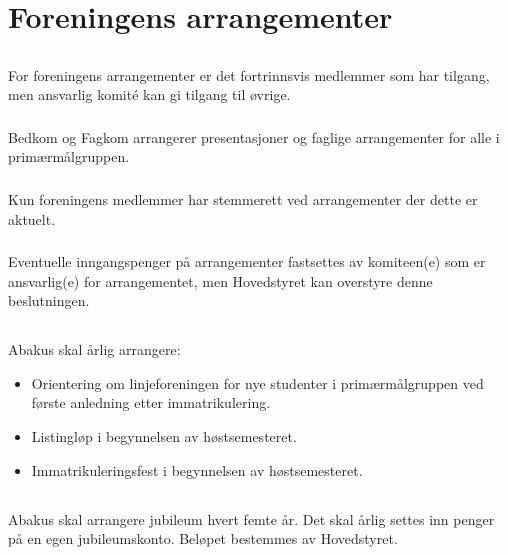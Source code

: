 \section{Foreningens arrangementer}

\subsection{}
\subsubsection{}
For foreningens arrangementer er det fortrinnsvis medlemmer som har tilgang, men ansvarlig komité kan gi tilgang til øvrige.

\subsubsection{}
Bedkom og Fagkom arrangerer presentasjoner og faglige arrangementer for alle i primærmålgruppen.

\subsubsection{}
Kun foreningens medlemmer har stemmerett ved arrangementer der dette er aktuelt.

\subsubsection{}
Eventuelle inngangspenger på arrangementer fastsettes av komiteen(e) som er
ansvarlig(e) for arrangementet, men Hovedstyret kan overstyre denne
beslutningen.

\subsection{}
Abakus skal årlig arrangere:

\begin{itemize}
  \item Orientering om linjeforeningen for nye studenter i primærmålgruppen ved første anledning etter immatrikulering.
  \item Listingløp i begynnelsen av høstsemesteret.
  \item Immatrikuleringsfest i begynnelsen av høstsemesteret.
\end{itemize}

\subsection{}
Abakus skal arrangere jubileum hvert femte år. Det skal årlig settes inn penger
på en egen jubileumskonto. Beløpet bestemmes av Hovedstyret.
